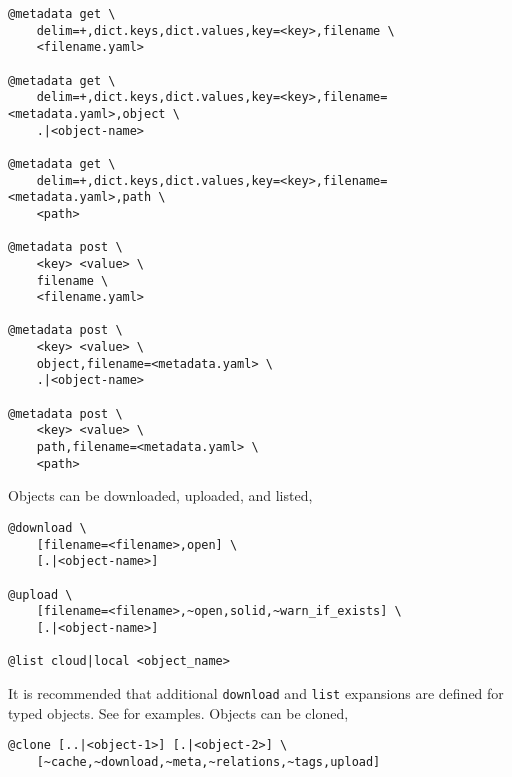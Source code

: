 %
\begin{verbatim}
@metadata get \
    delim=+,dict.keys,dict.values,key=<key>,filename \
    <filename.yaml>
    
@metadata get \
    delim=+,dict.keys,dict.values,key=<key>,filename=<metadata.yaml>,object \
    .|<object-name>
    
@metadata get \
    delim=+,dict.keys,dict.values,key=<key>,filename=<metadata.yaml>,path \
    <path>
    
@metadata post \
    <key> <value> \
    filename \
    <filename.yaml>
    
@metadata post \
    <key> <value> \
    object,filename=<metadata.yaml> \
    .|<object-name>
    
@metadata post \
    <key> <value> \
    path,filename=<metadata.yaml> \
    <path>
\end{verbatim}
%
Objects can be downloaded, uploaded, and listed,
%
\begin{verbatim}
@download \
    [filename=<filename>,open] \
    [.|<object-name>]

@upload \
    [filename=<filename>,~open,solid,~warn_if_exists] \
    [.|<object-name>]
    
@list cloud|local <object_name>
\end{verbatim}
%
It is recommended that additional \texttt{download} and \texttt{list} expansions are defined for typed objects. See  for examples. Objects can be cloned,
%
\begin{verbatim}
@clone [..|<object-1>] [.|<object-2>] \
    [~cache,~download,~meta,~relations,~tags,upload]
\end{verbatim}